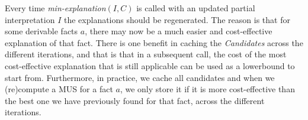 Every time \textit{min-explanation$(I,C)$} is called with an updated partial interpretation $I$ the explanations should be regenerated. The reason is that for some derivable facts $a$, there may now be a much easier and cost-effective explanation of that fact.
There is one benefit in caching the \textit{Candidates} across the different iterations, and that is that in a subsequent call, the cost of the most cost-effective explanation that is still applicable can be used as a lowerbound to start from.
Furthermore, in practice, we cache all candidates and when we (re)compute a MUS for a fact $a$, we only store it if it is more cost-effective than the best one we have previously found for that fact, across the different iterations.
